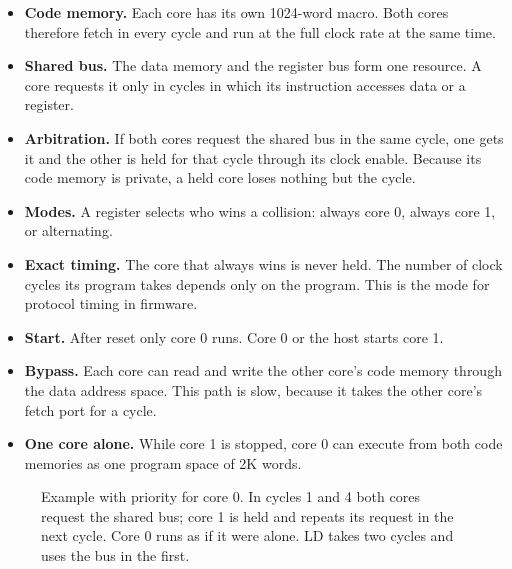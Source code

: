 \documentclass[10pt,a4paper]{article}
\begin{document}
\begin{itemize}
\item \textbf{Code memory.} Each core has its own 1024-word macro. Both cores therefore fetch in every cycle and
run at the full clock rate at the same time.
\item \textbf{Shared bus.} The data memory and the register bus form one resource. A core requests it only in
cycles in which its instruction accesses data or a register.
\item \textbf{Arbitration.} If both cores request the shared bus in the same cycle, one gets it and the other is
held for that cycle through its clock enable. Because its code memory is private, a held core loses nothing but
the cycle.
\item \textbf{Modes.} A register selects who wins a collision: always core 0, always core 1, or alternating.
\item \textbf{Exact timing.} The core that always wins is never held. The number of clock cycles its program
takes depends only on the program. This is the mode for protocol timing in firmware.
\item \textbf{Start.} After reset only core 0 runs. Core 0 or the host starts core 1.
\item \textbf{Bypass.} Each core can read and write the other core's code memory through the data address
space. This path is slow, because it takes the other core's fetch port for a cycle.
\item \textbf{One core alone.} While core 1 is stopped, core 0 can execute from both code memories as one
program space of 2K words.
\end{itemize}

\begin{figure}[!htb]
\centering
{}
\caption{Example with priority for core 0. In cycles 1 and 4 both cores request the shared bus; core 1 is held
and repeats its request in the next cycle. Core 0 runs as if it were alone. LD takes two cycles and uses the bus in the first.}
\label{fig:sched}
\end{figure}
\end{document}
